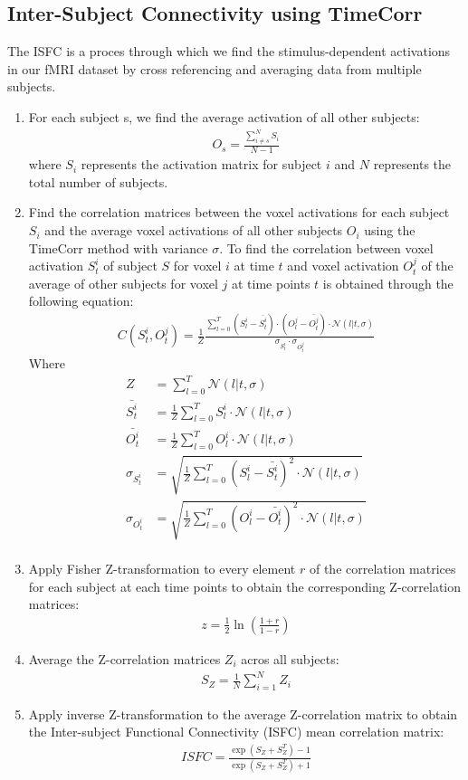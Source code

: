 \documentclass[12pt]{article}
\begin{document}
\subsection{Inter-Subject Connectivity using TimeCorr}
The ISFC is a proces through which we find the stimulus-dependent activations in our fMRI dataset by cross referencing and averaging data from multiple subjects.\\
\begin{enumerate}
\item For each subject s, we find the average activation of all other subjects:
\begin{align*}
O_s=\frac{\sum_{i\neq s}^N S_i}{N-1}
\end{align*}
where $S_i$ represents the activation matrix for subject $i$ and $N$ represents the total number of subjects.
\item Find the correlation matrices between the voxel activations for each subject $S_i$ and the average voxel activations of all other subjects $O_{i}$ using the TimeCorr method with variance $\sigma$. To find the correlation between voxel activation $S^i_t$ of subject $S$ for voxel $i$ at time $t$ and voxel activation $O^j_t$ of the average of other subjects for voxel $j$ at time points $t$ is obtained through the following equation:
\begin{align*}
C(S^i_t,O^j_t) = \frac{1}{Z}\frac{\sum_{l=0}^T (S_l^i - \bar{S^i_t})\cdot(O^j_l - \bar{O^j_t})\cdot \mathcal{N}(l|t,\sigma)}{\sigma_{S_t^i} \cdot \sigma_{O_t^j}}
\end{align*}
Where
\begin{align*}
Z &= \sum_{l=0}^T \mathcal{N}(l|t,\sigma)\\
\bar{S^i_t} &=\frac{1}{Z} \sum_{l=0}^T S^i_l \cdot \mathcal{N}(l|t,\sigma)\\
\bar{O^i_t} &=\frac{1}{Z} \sum_{l=0}^T O^i_l \cdot \mathcal{N}(l|t,\sigma)\\
\sigma_{S_t^i} &=\sqrt{ \frac{1}{Z}\sum_{l=0}^T (S_l^i-\bar{S_t^i})^2 \cdot \mathcal{N}(l|t,\sigma)}\\
\sigma_{O_t^i} &=\sqrt{ \frac{1}{Z}\sum_{l=0}^T (O_l^i-\bar{O_t^i})^2 \cdot \mathcal{N}(l|t,\sigma)}\\
\end{align*}
\item Apply Fisher Z-transformation to every element $r$ of the correlation matrices for each subject at each time points to obtain the corresponding Z-correlation matrices:
\begin{align*}
z = \frac{1}{2}\ln(\frac{1+r}{1-r})
\end{align*}
\item Average the Z-correlation matrices $Z_i$ acros all subjects:
\begin{align*}
S_Z = \frac{1}{N}\sum^N_{i=1}Z_i
\end{align*}
\item Apply inverse Z-transformation to the average Z-correlation matrix to obtain the Inter-subject Functional Connectivity (ISFC) mean correlation matrix:
\begin{align*}
ISFC = \frac{\exp(S_Z+S_Z^T)-1}{\exp(S_Z+S_Z^T)+1}
\end{align*}
\end{enumerate}
\end{document}
